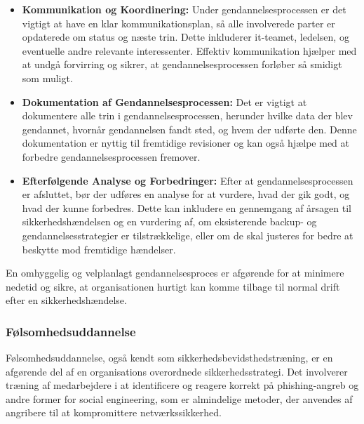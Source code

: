 \begin{itemize}
	\item \textbf{Kommunikation og Koordinering:} Under gendannelsesprocessen er det vigtigt at have en klar kommunikationsplan, så alle involverede parter er opdaterede om status og næste trin. Dette inkluderer it-teamet, ledelsen, og eventuelle andre relevante interessenter. Effektiv kommunikation hjælper med at undgå forvirring og sikrer, at gendannelsesprocessen forløber så smidigt som muligt.
	
	\item \textbf{Dokumentation af Gendannelsesprocessen:} Det er vigtigt at dokumentere alle trin i gendannelsesprocessen, herunder hvilke data der blev gendannet, hvornår gendannelsen fandt sted, og hvem der udførte den. Denne dokumentation er nyttig til fremtidige revisioner og kan også hjælpe med at forbedre gendannelsesprocessen fremover.
	
	\item \textbf{Efterfølgende Analyse og Forbedringer:} Efter at gendannelsesprocessen er afsluttet, bør der udføres en analyse for at vurdere, hvad der gik godt, og hvad der kunne forbedres. Dette kan inkludere en gennemgang af årsagen til sikkerhedshændelsen og en vurdering af, om eksisterende backup- og gendannelsesstrategier er tilstrækkelige, eller om de skal justeres for bedre at beskytte mod fremtidige hændelser.
\end{itemize}
\noindent
En omhyggelig og velplanlagt gendannelsesproces er afgørende for at minimere nedetid og sikre, at organisationen hurtigt kan komme tilbage til normal drift efter en sikkerhedshændelse.


\subsubsection{Følsomhedsuddannelse}
Følsomhedsuddannelse, også kendt som sikkerhedsbevidsthedstræning, er en afgørende del af en organisations overordnede sikkerhedsstrategi. Det involverer træning af medarbejdere i at identificere og reagere korrekt på phishing-angreb og andre former for social engineering, som er almindelige metoder, der anvendes af angribere til at kompromittere netværkssikkerhed.

